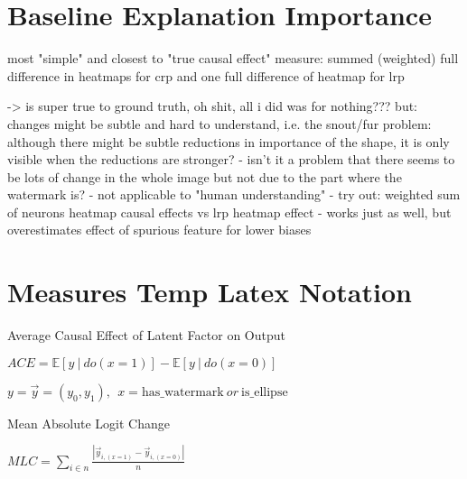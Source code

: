 

\section{Baseline Explanation Importance}
most "simple" and closest to "true causal effect" measure:
summed (weighted) full difference in heatmaps for crp and one full difference of heatmap for lrp

-> is super true to ground truth, oh shit, all i did was for nothing???
but: changes might be subtle and hard to understand, i.e. the snout/fur problem: although there might be subtle reductions in importance of the shape, it is only visible when the reductions are stronger? 
- isn't it a problem that there seems to be lots of change in the whole image but not due to the part where the watermark is? 
- not applicable to "human understanding"
- try out: weighted sum of neurons heatmap causal effects vs lrp heatmap effect 
- works just as well, but overestimates effect of spurious feature for lower biases



\section{Measures Temp Latex Notation}

\begin{center}
    Average Causal Effect of Latent Factor on Output

    $\displaystyle ACE = \mathbb{E} [ y \ | \ do(x=1) ] - \mathbb{E} [ y \ | \ do(x=0) ]$
    \vspace{0.5cm}

    $y = \vec{y} = (y_0, y_1), \ \ x = \mathrm{has\_watermark} \ or \ \mathrm{is\_ellipse}$
    \vspace{0.5cm}

    Mean Absolute Logit Change

    $\displaystyle MLC = \sum_{i \in n} \frac{|\vec{y}_{i, (x=1)}- \vec{y}_{i, (x=0)} |}{n}$


\end{center}


